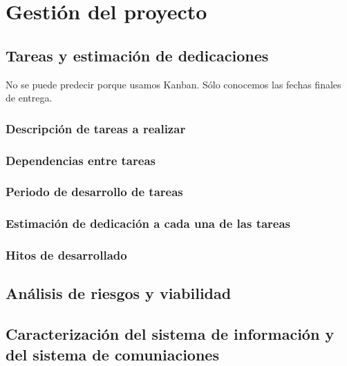\chapter{Gestión del proyecto}\label{ch:gestion}




\section{Tareas y estimación de dedicaciones}
No se puede predecir porque usamos Kanban. Sólo conocemos las fechas finales de
entrega.
\subsection{Descripción de tareas a realizar}

\subsection{Dependencias entre tareas}

\subsection{Periodo de desarrollo de tareas}

\subsection{Estimación de dedicación a cada una de las tareas}

\subsection{Hitos de desarrollado}


\section{Análisis de riesgos y viabilidad}


\section{Caracterización del sistema de información y del sistema de comuniaciones}

